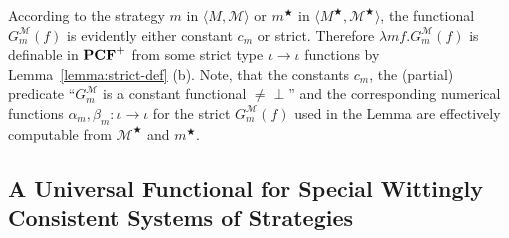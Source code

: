 \documentclass[fleqn]{LMCS}
\theoremstyle{plain}\newtheorem{satz}[thm]{Satz}
\theoremstyle{plain}\newtheorem{hyp}[thm]{Hypothesis}
\theoremstyle{plain}\newtheorem{hyps}[thm]{Hypotheses}
\theoremstyle{definition}\newtheorem{note}[thm]{Note}
\newcommand{\arr}{\rightarrow}
\newcommand{\la}{\langle}
\newcommand{\ra}{\rangle}
\newcommand{\tuple}[1]{\la #1 \ra}
\newcommand{\G}{G}
\newcommand{\PCF}{\mbox{\bf PCF}}
\newcommand{\bottom}{{\perp}}
\newcommand{\MM}{{\mathcal M}}
\newcommand{\sM}{M^{\bigstar}}
\newcommand{\sm}{m^{\bigstar}}
\newcommand{\sMM}{\MM^{\bigstar}}
\newcommand{\?}{\mbox{?}}
\begin{document}
According to the strategy $m$ in $\tuple{M,\MM}$ or $\sm$ in 
$\tuple{\sM,\sMM}$, the functional $\G^{\MM}_m(f)$ is 
evidently either constant $c_m$ or strict. 
Therefore $\lambda mf.\G^{\MM}_m(f)$ is definable 
in $\PCF^+$ from some strict type $\iota\arr\iota$ functions 
by Lemma~\ref{lemma:strict-def} (b). 
Note, that the constants $c_m$, the (partial) predicate  
``$\G^{\MM}_m$ is a constant functional ${}\ne\bottom$'' 
and the corresponding numerical functions  
$\alpha_m,\beta_m:\iota\arr\iota$
for the strict $\G^{\MM}_m(f)$ 
used in the Lemma are effectively computable from $\sMM$ and $\sm$. 






\subsection{A Universal Functional for Special Wittingly Consistent 
Systems of Strategies}
\label{sec:univ-special}
\end{document}
